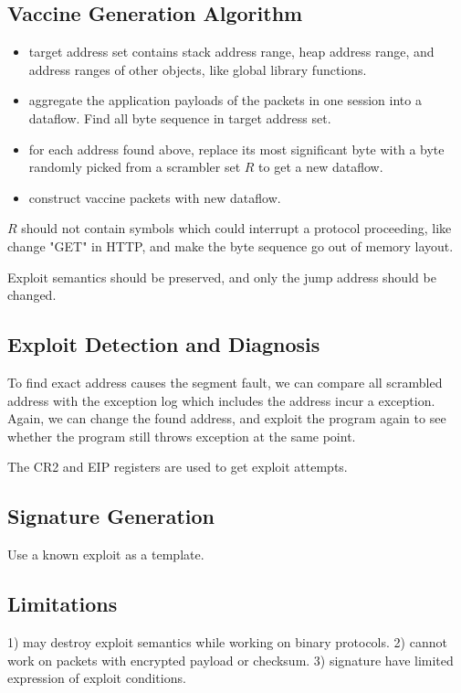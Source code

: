 \documentclass[]{article}
\begin{document}
\subsection{Vaccine Generation Algorithm}
\begin{itemize}
 \item  target address set contains
 stack address range, heap address range, and address ranges of 
 other objects, like global library functions.
 \item aggregate the application payloads of the packets in one 
 session into a dataflow. Find all byte sequence in target address 
 set.
 \item for each address found above, replace its most significant
 byte with a byte randomly picked from a scrambler set $R$ to get a
 new dataflow.
 \item construct vaccine packets with new dataflow.
\end{itemize}
$R$ should not contain symbols which could interrupt a protocol 
proceeding, like change "GET" in HTTP, and make the byte 
sequence go out of memory layout.

Exploit semantics should be preserved, and only the jump address
should be changed.

\subsection{Exploit Detection and Diagnosis}
To find exact address causes the segment fault, we can compare all
scrambled address with the exception log which includes the address
incur a exception. Again, we can change the found address, and
exploit the program again to see whether the program still throws
exception at the same point.

The CR2 and EIP registers are used to get exploit attempts.

\subsection{Signature Generation}
Use a known exploit as a template.

\subsection{Limitations}
1) may destroy exploit semantics while working on binary protocols.
2) cannot work on packets with encrypted payload or checksum.
3) signature have limited expression of exploit conditions.
\end{document}
